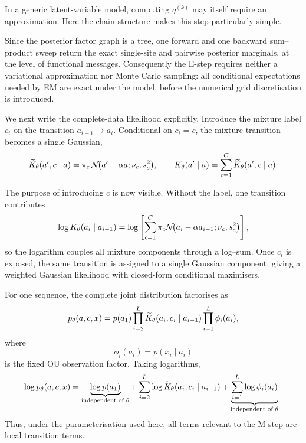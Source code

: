 In a generic latent-variable model, computing $q^{(k)}$ may itself require an
approximation. Here the chain structure makes this step particularly simple.

\begin{proposition}\label{prop:em-estep}
Since the posterior factor graph is a tree, one forward and one backward
sum--product sweep return the exact single-site and pairwise posterior
marginals, at the level of functional messages. Consequently the E-step
requires neither a variational approximation nor Monte Carlo sampling: all
conditional expectations needed by EM are exact under the model, before the
numerical grid discretisation is introduced.
\end{proposition}

We next write the complete-data likelihood explicitly. Introduce the mixture
label $c_i$ on the transition $a_{i-1}\to a_i$. Conditional on $c_i=c$, the
mixture transition becomes a single Gaussian,
\begin{equation}
  \widetilde{K}_\theta(a',c\mid a)
  =
  \pi_c\,
  \mathcal{N}\!\big(
    a'-\alpha a;
    \nu_c,s_c^2
  \big),
  \qquad
  K_\theta(a'\mid a)
  =
  \sum_{c=1}^{C}
  \widetilde{K}_\theta(a',c\mid a).
  \label{eq:em-complete-kernel}
\end{equation}

The purpose of introducing $c$ is now visible. Without the label, one
transition contributes
\begin{equation}
  \log K_\theta(a_i\mid a_{i-1})
  =
  \log
  \left[
    \sum_{c=1}^{C}
    \pi_c
    \mathcal{N}\!\big(
      a_i-\alpha a_{i-1};
      \nu_c,s_c^2
    \big)
  \right],
  \label{eq:em-log-mixture}
\end{equation}
so the logarithm couples all mixture components through a log--sum. Once
$c_i$ is exposed, the same transition is assigned to a single Gaussian
component, giving a weighted Gaussian likelihood with closed-form conditional
maximisers.

For one sequence, the complete joint distribution factorises as
\begin{equation}
  p_\theta(a,c,x)
  =
  p(a_1)
  \prod_{i=2}^{L}
  \widetilde{K}_\theta(a_i,c_i\mid a_{i-1})
  \prod_{i=1}^{L}
  \phi_i(a_i),
  \label{eq:em-complete-factorisation}
\end{equation}
where
\[
  \phi_i(a_i)=p(x_i\mid a_i)
\]
is the fixed OU observation factor. Taking logarithms,
\begin{equation}
  \log p_\theta(a,c,x)
  =
  \underbrace{\log p(a_1)}_{\text{independent of }\theta}
  +
  \sum_{i=2}^{L}
  \log
  \widetilde{K}_\theta(a_i,c_i\mid a_{i-1})
  +
  \underbrace{
    \sum_{i=1}^{L}\log\phi_i(a_i)
  }_{\text{independent of }\theta}.
  \label{eq:em-complete-ll}
\end{equation}
Thus, under the parameterisation used here, all terms relevant to the
M-step are local transition terms.

